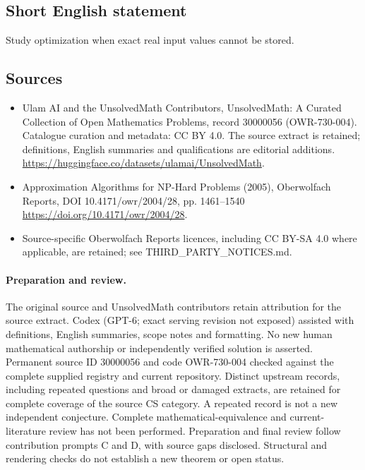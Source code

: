 \documentclass[11pt]{article}
\begin{document}
\subsection{Short English statement}
Study optimization when exact real input values cannot be stored.
\subsection{Sources}
\begin{itemize}
\item[\hypertarget{source:30000056:1}{S1}] Ulam AI and the UnsolvedMath Contributors, UnsolvedMath: A Curated Collection of Open Mathematics Problems, record 30000056 (OWR-730-004). Catalogue curation and metadata: CC BY 4.0. The source extract is retained; definitions, English summaries and qualifications are editorial additions.
\url{https://huggingface.co/datasets/ulamai/UnsolvedMath}.
\item[\hypertarget{source:30000056:2}{S2}] Approximation Algorithms for NP-Hard Problems (2005), Oberwolfach Reports, DOI 10.4171/owr/2004/28, pp. 1461--1540
\url{https://doi.org/10.4171/owr/2004/28}.
\item Source-specific Oberwolfach Reports licences, including CC BY-SA 4.0 where applicable, are retained; see THIRD\_PARTY\_NOTICES.md.
\end{itemize}
\paragraph{Preparation and review.}
The original source and UnsolvedMath contributors retain attribution for the source extract. Codex (GPT-6; exact serving revision not exposed) assisted with definitions, English summaries, scope notes and formatting. No new human mathematical authorship or independently verified solution is asserted. Permanent source ID 30000056 and code OWR-730-004 checked against the complete supplied registry and current repository. Distinct upstream records, including repeated questions and broad or damaged extracts, are retained for complete coverage of the source CS category. A repeated record is not a new independent conjecture. Complete mathematical-equivalence and current-literature review has not been performed. Preparation and final review follow contribution prompts C and D, with source gaps disclosed. Structural and rendering checks do not establish a new theorem or open status.
\label{end:30000056}
\end{document}
